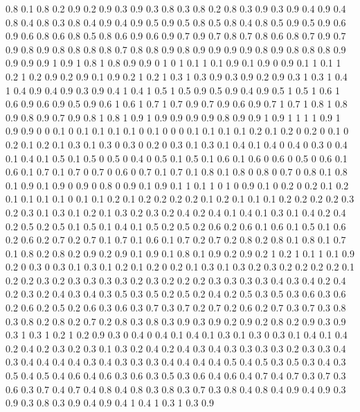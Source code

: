 0.8 0.1
0.8 0.2
0.9 0.2
0.9 0.3
0.9 0.3
0.8 0.3
0.8 0.2
0.8 0.3
0.9 0.3
0.9 0.4
0.9 0.4
0.8 0.4
0.8 0.3
0.8 0.4
0.9 0.4
0.9 0.5
0.9 0.5
0.8 0.5
0.8 0.4
0.8 0.5
0.9 0.5
0.9 0.6
0.9 0.6
0.8 0.6
0.8 0.5
0.8 0.6
0.9 0.6
0.9 0.7
0.9 0.7
0.8 0.7
0.8 0.6
0.8 0.7
0.9 0.7
0.9 0.8
0.9 0.8
0.8 0.8
0.8 0.7
0.8 0.8
0.9 0.8
0.9 0.9
0.9 0.9
0.8 0.9
0.8 0.8
0.8 0.9
0.9 0.9
0.9 1
0.9 1
0.8 1
0.8 0.9
0.9 0
1 0
1 0.1
1 0.1
0.9 0.1
0.9 0
0.9 0.1
1 0.1
1 0.2
1 0.2
0.9 0.2
0.9 0.1
0.9 0.2
1 0.2
1 0.3
1 0.3
0.9 0.3
0.9 0.2
0.9 0.3
1 0.3
1 0.4
1 0.4
0.9 0.4
0.9 0.3
0.9 0.4
1 0.4
1 0.5
1 0.5
0.9 0.5
0.9 0.4
0.9 0.5
1 0.5
1 0.6
1 0.6
0.9 0.6
0.9 0.5
0.9 0.6
1 0.6
1 0.7
1 0.7
0.9 0.7
0.9 0.6
0.9 0.7
1 0.7
1 0.8
1 0.8
0.9 0.8
0.9 0.7
0.9 0.8
1 0.8
1 0.9
1 0.9
0.9 0.9
0.9 0.8
0.9 0.9
1 0.9
1 1
1 1
0.9 1
0.9 0.9
0 0
0.1 0
0.1 0.1
0.1 0.1
0 0.1
0 0
0 0.1
0.1 0.1
0.1 0.2
0.1 0.2
0 0.2
0 0.1
0 0.2
0.1 0.2
0.1 0.3
0.1 0.3
0 0.3
0 0.2
0 0.3
0.1 0.3
0.1 0.4
0.1 0.4
0 0.4
0 0.3
0 0.4
0.1 0.4
0.1 0.5
0.1 0.5
0 0.5
0 0.4
0 0.5
0.1 0.5
0.1 0.6
0.1 0.6
0 0.6
0 0.5
0 0.6
0.1 0.6
0.1 0.7
0.1 0.7
0 0.7
0 0.6
0 0.7
0.1 0.7
0.1 0.8
0.1 0.8
0 0.8
0 0.7
0 0.8
0.1 0.8
0.1 0.9
0.1 0.9
0 0.9
0 0.8
0 0.9
0.1 0.9
0.1 1
0.1 1
0 1
0 0.9
0.1 0
0.2 0
0.2 0.1
0.2 0.1
0.1 0.1
0.1 0
0.1 0.1
0.2 0.1
0.2 0.2
0.2 0.2
0.1 0.2
0.1 0.1
0.1 0.2
0.2 0.2
0.2 0.3
0.2 0.3
0.1 0.3
0.1 0.2
0.1 0.3
0.2 0.3
0.2 0.4
0.2 0.4
0.1 0.4
0.1 0.3
0.1 0.4
0.2 0.4
0.2 0.5
0.2 0.5
0.1 0.5
0.1 0.4
0.1 0.5
0.2 0.5
0.2 0.6
0.2 0.6
0.1 0.6
0.1 0.5
0.1 0.6
0.2 0.6
0.2 0.7
0.2 0.7
0.1 0.7
0.1 0.6
0.1 0.7
0.2 0.7
0.2 0.8
0.2 0.8
0.1 0.8
0.1 0.7
0.1 0.8
0.2 0.8
0.2 0.9
0.2 0.9
0.1 0.9
0.1 0.8
0.1 0.9
0.2 0.9
0.2 1
0.2 1
0.1 1
0.1 0.9
0.2 0
0.3 0
0.3 0.1
0.3 0.1
0.2 0.1
0.2 0
0.2 0.1
0.3 0.1
0.3 0.2
0.3 0.2
0.2 0.2
0.2 0.1
0.2 0.2
0.3 0.2
0.3 0.3
0.3 0.3
0.2 0.3
0.2 0.2
0.2 0.3
0.3 0.3
0.3 0.4
0.3 0.4
0.2 0.4
0.2 0.3
0.2 0.4
0.3 0.4
0.3 0.5
0.3 0.5
0.2 0.5
0.2 0.4
0.2 0.5
0.3 0.5
0.3 0.6
0.3 0.6
0.2 0.6
0.2 0.5
0.2 0.6
0.3 0.6
0.3 0.7
0.3 0.7
0.2 0.7
0.2 0.6
0.2 0.7
0.3 0.7
0.3 0.8
0.3 0.8
0.2 0.8
0.2 0.7
0.2 0.8
0.3 0.8
0.3 0.9
0.3 0.9
0.2 0.9
0.2 0.8
0.2 0.9
0.3 0.9
0.3 1
0.3 1
0.2 1
0.2 0.9
0.3 0
0.4 0
0.4 0.1
0.4 0.1
0.3 0.1
0.3 0
0.3 0.1
0.4 0.1
0.4 0.2
0.4 0.2
0.3 0.2
0.3 0.1
0.3 0.2
0.4 0.2
0.4 0.3
0.4 0.3
0.3 0.3
0.3 0.2
0.3 0.3
0.4 0.3
0.4 0.4
0.4 0.4
0.3 0.4
0.3 0.3
0.3 0.4
0.4 0.4
0.4 0.5
0.4 0.5
0.3 0.5
0.3 0.4
0.3 0.5
0.4 0.5
0.4 0.6
0.4 0.6
0.3 0.6
0.3 0.5
0.3 0.6
0.4 0.6
0.4 0.7
0.4 0.7
0.3 0.7
0.3 0.6
0.3 0.7
0.4 0.7
0.4 0.8
0.4 0.8
0.3 0.8
0.3 0.7
0.3 0.8
0.4 0.8
0.4 0.9
0.4 0.9
0.3 0.9
0.3 0.8
0.3 0.9
0.4 0.9
0.4 1
0.4 1
0.3 1
0.3 0.9
